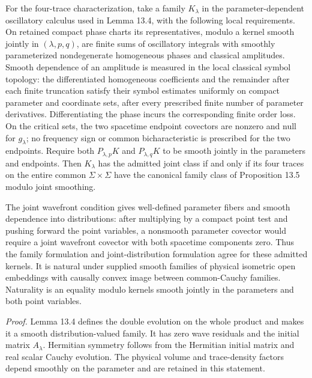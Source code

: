 \documentclass[
  english,
  11pt,
  reqno]{amsart}
\begin{document}
For the four-trace characterization, take a family \(K_\lambda\) in the
parameter-dependent oscillatory calculus used in Lemma 13.4, with the
following local requirements. On retained compact phase charts its
representatives, modulo a kernel smooth jointly in \((\lambda,p,q)\),
are finite sums of oscillatory integrals with smoothly parameterized
nondegenerate homogeneous phases and classical amplitudes. Smooth
dependence of an amplitude is measured in the local classical symbol
topology: the differentiated homogeneous coefficients and the remainder
after each finite truncation satisfy their symbol estimates uniformly on
compact parameter and coordinate sets, after every prescribed finite
number of parameter derivatives. Differentiating the phase incurs the
corresponding finite order loss. On the critical sets, the two spacetime
endpoint covectors are nonzero and null for \(g_\lambda\); no frequency
sign or common bicharacteristic is prescribed for the two endpoints.
Require both \(P_{\lambda,p}K\) and \(P_{\lambda,q}K\) to be smooth
jointly in the parameters and endpoints. Then \(K_\lambda\) has the
admitted joint class if and only if its four traces on the entire common
\(\Sigma\times\Sigma\) have the canonical family class of Proposition
13.5 modulo joint smoothing.

The joint wavefront condition gives well-defined parameter fibers and
smooth dependence into distributions: after multiplying by a compact
point test and pushing forward the point variables, a nonsmooth
parameter covector would require a joint wavefront covector with both
spacetime components zero. Thus the family formulation and
joint-distribution formulation agree for these admitted kernels. It is
natural under supplied smooth families of physical isometric open
embeddings with causally convex image between common-Cauchy families.
Naturality is an equality modulo kernels smooth jointly in the
parameters and both point variables.

\emph{Proof.} Lemma 13.4 defines the double evolution on the whole
product and makes it a smooth distribution-valued family. It has zero
wave residuals and the initial matrix \(A_\lambda\). Hermitian symmetry
follows from the Hermitian initial matrix and real scalar Cauchy
evolution. The physical volume and trace-density factors depend smoothly
on the parameter and are retained in this statement.
\end{document}
